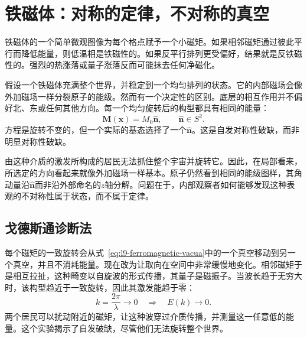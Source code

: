 \begin{classroomqa}
\end{classroomqa}

\begin{center}
\end{center}

\section{铁磁体：对称的定律，不对称的真空}

铁磁体的一个简单微观图像为每个格点赋予一个小磁矩。如果相邻磁矩通过彼此平行而降低能量，则低温相是铁磁性的。如果反平行排列更受偏好，结果就是反铁磁性的。强烈的热涨落或量子涨落反而可能抹去任何净磁化。

假设一个铁磁体充满整个世界，并稳定到一个均匀排列的状态。它的内部磁场会像外加磁场一样分裂原子的能级。然而有一个决定性的区别。底层的相互作用并不偏好北、东或任何其他方向。每一个均匀旋转后的构型都具有相同的能量：
\begin{equation}
\mathbf M(\mathbf x)=M_0\hat{\mathbf n},
\qquad
\hat{\mathbf n}\in S^2.
\label{eq:l9-ferromagnetic-vacua}
\end{equation}
方程是旋转不变的，但一个实际的基态选择了一个\(\hat{\mathbf n}\)。这是自发对称性破缺，而非明显对称性破缺。

由这种介质的激发所构成的居民无法抓住整个宇宙并旋转它。因此，在局部看来，所选定的方向看起来就像外加磁场一样基本。原子仍然看到相同的能级图样，其角动量沿\(\hat{\mathbf n}\)而非沿外部命名的\(z\)轴分解。问题在于，内部观察者如何能够发现这种表观的不对称性属于状态，而不属于定律。

\subsection{戈德斯通诊断法}

每个磁矩的一致旋转会从式~\eqref{eq:l9-ferromagnetic-vacua}中的一个真空移动到另一个真空，并且不消耗能量。现在改为让取向在空间中非常缓慢地变化。相邻磁矩于是相互拉扯，这种畸变以自旋波的形式传播，其量子是磁振子。当波长趋于无穷大时，该构型趋近于一致旋转，因此其激发能趋于零：
\begin{equation}
k=\frac{2\pi}{\lambda}\longrightarrow0
\quad\Longrightarrow\quad
E(k)\longrightarrow0.
\label{eq:l9-gapless-magnon}
\end{equation}
两个居民可以扰动附近的磁矩，让这种波穿过介质传播，并测量这一任意低的能量。这个实验揭示了自发破缺，尽管他们无法旋转整个世界。

